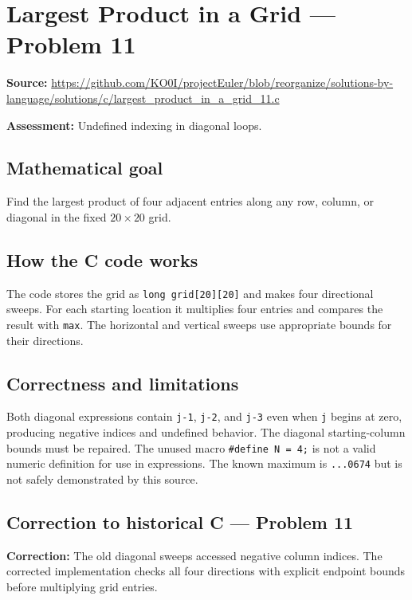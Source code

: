 \section{Largest Product in a Grid --- Problem 11}
\label{prob:11}
\noindent\textbf{Source:} \url{https://github.com/KO0I/projectEuler/blob/reorganize/solutions-by-language/solutions/c/largest_product_in_a_grid_11.c}

\noindent\textbf{Assessment:} Undefined indexing in diagonal loops.

\subsection*{Mathematical goal}
Find the largest product of four adjacent entries along any row, column, or diagonal in the fixed \(20\times20\) grid.

\subsection*{How the C code works}
The code stores the grid as \verb|long grid[20][20]| and makes four directional sweeps. For each starting location it multiplies four entries and compares the result with \verb|max|. The horizontal and vertical sweeps use appropriate bounds for their directions.

\subsection*{Correctness and limitations}
Both diagonal expressions contain \verb|j-1|, \verb|j-2|, and \verb|j-3| even when \verb|j| begins at zero, producing negative indices and undefined behavior. The diagonal starting-column bounds must be repaired. The unused macro \verb|#define N = 4;| is not a valid numeric definition for use in expressions. The known maximum is \texttt{...0674} but is not safely demonstrated by this source.


\subsection*{Correction to historical C --- Problem 11}
{\color{red}\textbf{Correction:} The old diagonal sweeps accessed negative column indices. The corrected implementation checks all four directions with explicit endpoint bounds before multiplying grid entries.}
